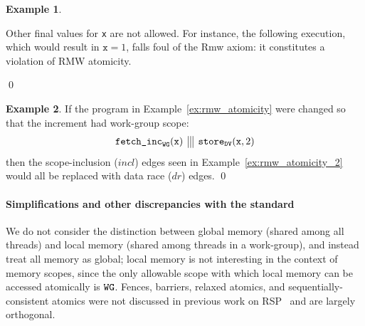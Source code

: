 \documentclass[svgnames,10pt]{sigplanconf}
\theoremstyle{definition}
\newtheorem{example}{Example}
\newenvironment{Example}{\begin{example}}{\qed\end{example}}
\newcommand\axiom[1]{\textsf{#1}}
\newcommand\var[1]{\mathit{#1}}
\newcommand\na{{\tt na}}
\newcommand\swg{{\tt WG}}
\newcommand\sdv{{\tt DV}}
\newcommand\evW{{\rm W}}
\newcommand\evRMW{{\rm RMW}}
\begin{document}
\begin{Example}
\begin{center}
\end{center}
Other final values for \texttt{x} are not allowed. For instance, the
following execution, which would result in $\texttt{x}=1$, falls foul
of the \axiom{Rmw} axiom: it constitutes a violation of RMW atomicity.
\begin{center}
\vspace*{-6mm}
\end{center}
\end{Example}

\begin{Example}
\label{ex:rmw_atomicity_3}
If the program in Example~\ref{ex:rmw_atomicity} were changed so that
the increment had work-group scope:
\[
\begin{array}{l|||l}
\texttt{fetch\_inc}_\swg(\texttt{x}) & 
\texttt{store}_\sdv(\texttt{x}, 2)
\end{array}
\]
then the scope-inclusion ($\var{incl}$) edges seen in Example~\ref{ex:rmw_atomicity_2}
would all be replaced with data race
($\var{dr}$) edges.
\end{Example}

\paragraph{Simplifications and other discrepancies with the standard}
We do not consider the distinction between global memory (shared among
all threads) and local memory (shared among threads in a work-group),
and instead treat all memory as global; local memory is not
interesting in the context of memory scopes, since the only allowable
scope with which local memory can be accessed atomically is $\swg$. Fences, barriers, relaxed atomics, and
sequentially-consistent atomics were not discussed in previous work on
RSP~\cite{orr+15} and are largely orthogonal.
\end{document}
